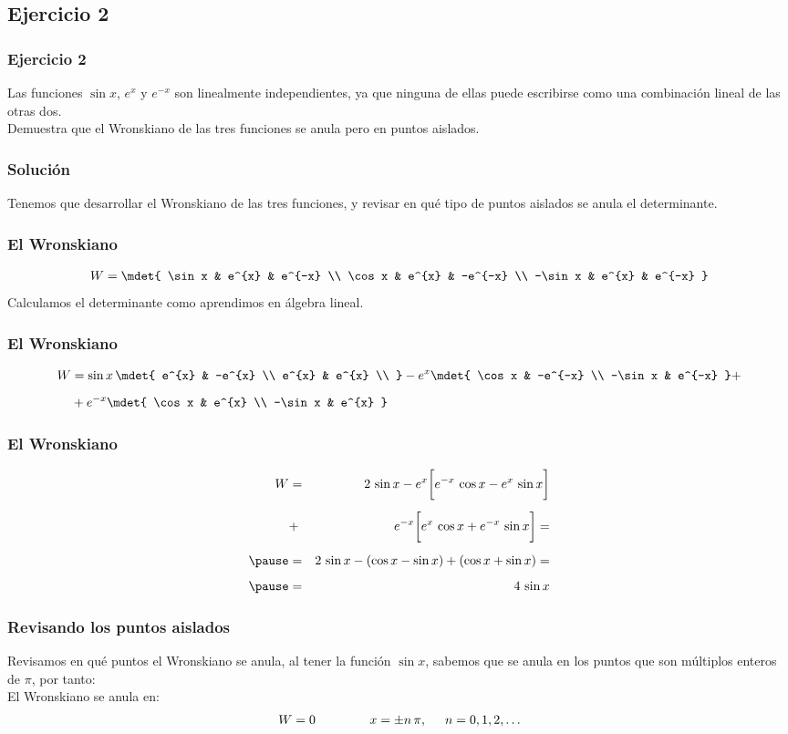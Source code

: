 \subsection{Ejercicio 2}
\begin{frame}
\frametitle{Ejercicio 2}
Las funciones $\sin x$, $e^{x}$ y $e^{-x}$ son linealmente independientes, ya que ninguna de ellas puede escribirse como una combinación lineal de las otras dos.
\\
\bigskip
\pause
Demuestra que el Wronskiano de las tres funciones se anula pero en puntos aislados.
\end{frame}
\begin{frame}
\frametitle{Solución}
Tenemos que desarrollar el Wronskiano de las tres funciones, y revisar en qué tipo de puntos aislados se anula el determinante.
\end{frame}
\begin{frame}
\frametitle{El Wronskiano}
\begin{align*}
W = \mdet{
\sin x & e^{x} & e^{-x} \\
\cos x & e^{x} & -e^{-x} \\
-\sin x & e^{x} & e^{-x}
}
\end{align*}
\pause
Calculamos el determinante como aprendimos en álgebra lineal.
\end{frame}
\begin{frame}
\frametitle{El Wronskiano}
\begin{align*}
W &= \sin x \, \mdet{
e^{x} & -e^{x} \\
e^{x} & e^{x} \\
} - e^{x} \mdet{
\cos x & -e^{-x} \\
-\sin x & e^{-x}
} + \\[0.5em]
&+e^{-x} \mdet{
\cos x & e^{x} \\
-\sin x & e^{x}
}
\end{align*}
\end{frame}
\begin{frame}
\frametitle{El Wronskiano}
\begin{eqnarray*}
W &=& 2 \, \sin x - e^{x} \bigg[ e^{-x} \, \cos x - e^{x} \, \sin x \bigg] \\[0.5em]
&+& e^{-x} \bigg[ e^{x} \, \cos x + e^{-x} \, \sin x \bigg] = \\[0.5em] \pause
&=& 2 \, \sin x - (\cos x -\sin x) + (\cos x + \sin x) = \\[0.5em] \pause
&=& 4 \, \sin x
\end{eqnarray*}
\end{frame}
\begin{frame}
\frametitle{Revisando los puntos aislados}
Revisamos en qué puntos el Wronskiano se anula, al tener la función $\sin x$, sabemos que se anula en los puntos que son múltiplos enteros de $\pi$, por tanto:
\\
\bigskip
\pause
El Wronskiano se anula en:
\begin{align*}
W = 0 \hspace{1.5cm} x = \pm n \, \pi, \hspace{0.5cm} n = 0, 1, 2, \ldots
\end{align*}
\end{frame}
